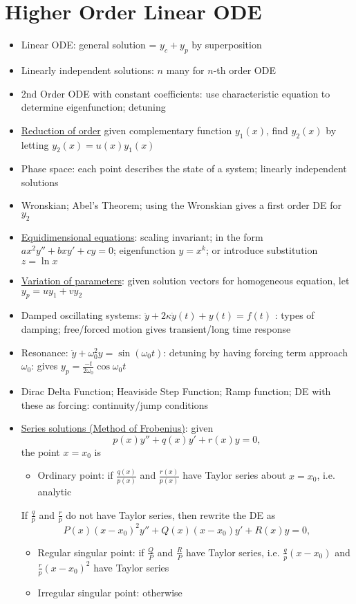 \section{Higher Order Linear ODE}
\begin{itemize}
    \item Linear ODE: general solution = $y_c + y_p$ by superposition
    \item Linearly independent solutions: $n$ many for $n$-th order ODE
    \item 2nd Order ODE with constant coefficients: use characteristic equation to determine eigenfunction; detuning
    \item \underline{Reduction of order} given complementary function $y_1(x)$, find $y_2(x)$ by letting $y_2(x) = u(x)y_1(x)$
    \item Phase space: each point describes the state of a system; linearly independent solutions
    \item Wronskian; Abel's Theorem; using the Wronskian gives a first order DE for $y_2$
    \item \underline{Equidimensional equations}: scaling invariant; in the form $ax^2y'' + bxy' + cy = 0$; eigenfunction $y=x^k$; or introduce substitution $ z = \ln x$
    \item \underline{Variation of parameters}: given solution vectors for homogeneous equation, let $y_p=uy_1+vy_2$
    \item Damped oscillating systems: $\ddot{y} + 2\kappa \dot{y}(t) + y(t) = f(t)$ : types of damping; free/forced motion gives transient/long time response
    \item Resonance: $ \ddot{y} +\omega_0^2 y = \sin(\omega_0 t)$: detuning by having forcing term approach $\omega_0$: gives $y_p = \frac{-t}{2\omega_0}\cos\omega_0 t$
    \item Dirac Delta Function; Heaviside Step Function; Ramp function; DE with these as forcing: continuity/jump conditions

    \item \underline{Series solutions (Method of Frobenius)}: given \[p(x)y''+q(x)y'+r(x)y = 0,\] the point $x = x_0$ is

          \begin{itemize}
              \item Ordinary point: if $\frac{q(x)}{p(x)}$ and $\frac{r(x)}{p(x)}$ have Taylor series about $x = x_0$, i.e. analytic
          \end{itemize}
          If $\frac{q}{p}$ and $\frac{r}{p}$ do not have Taylor series, then rewrite the DE as \[P(x)(x-x_0)^2y''+Q(x)(x-x_0)y'+R(x)y=0,\]
          \begin{itemize}
              \item Regular singular point: if $\frac{Q}{P}$ and $\frac{R}{P}$ have Taylor series, i.e. $\frac{q}{p}(x-x_0)$ and $\frac{r}{p}(x-x_0)^2$ have Taylor series
              \item Irregular singular point: otherwise
          \end{itemize}


\end{itemize}
